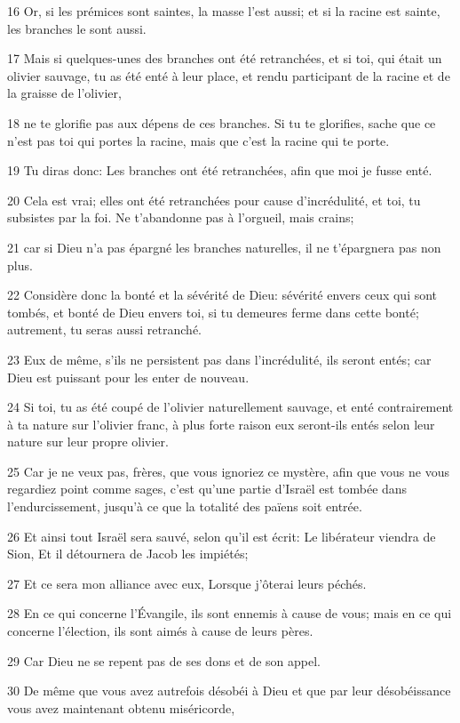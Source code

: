 \par 16 Or, si les prémices sont saintes, la masse l'est aussi; et si la racine est sainte, les branches le sont aussi.
\par 17 Mais si quelques-unes des branches ont été retranchées, et si toi, qui était un olivier sauvage, tu as été enté à leur place, et rendu participant de la racine et de la graisse de l'olivier,
\par 18 ne te glorifie pas aux dépens de ces branches. Si tu te glorifies, sache que ce n'est pas toi qui portes la racine, mais que c'est la racine qui te porte.
\par 19 Tu diras donc: Les branches ont été retranchées, afin que moi je fusse enté.
\par 20 Cela est vrai; elles ont été retranchées pour cause d'incrédulité, et toi, tu subsistes par la foi. Ne t'abandonne pas à l'orgueil, mais crains;
\par 21 car si Dieu n'a pas épargné les branches naturelles, il ne t'épargnera pas non plus.
\par 22 Considère donc la bonté et la sévérité de Dieu: sévérité envers ceux qui sont tombés, et bonté de Dieu envers toi, si tu demeures ferme dans cette bonté; autrement, tu seras aussi retranché.
\par 23 Eux de même, s'ils ne persistent pas dans l'incrédulité, ils seront entés; car Dieu est puissant pour les enter de nouveau.
\par 24 Si toi, tu as été coupé de l'olivier naturellement sauvage, et enté contrairement à ta nature sur l'olivier franc, à plus forte raison eux seront-ils entés selon leur nature sur leur propre olivier.
\par 25 Car je ne veux pas, frères, que vous ignoriez ce mystère, afin que vous ne vous regardiez point comme sages, c'est qu'une partie d'Israël est tombée dans l'endurcissement, jusqu'à ce que la totalité des païens soit entrée.
\par 26 Et ainsi tout Israël sera sauvé, selon qu'il est écrit: Le libérateur viendra de Sion, Et il détournera de Jacob les impiétés;
\par 27 Et ce sera mon alliance avec eux, Lorsque j'ôterai leurs péchés.
\par 28 En ce qui concerne l'Évangile, ils sont ennemis à cause de vous; mais en ce qui concerne l'élection, ils sont aimés à cause de leurs pères.
\par 29 Car Dieu ne se repent pas de ses dons et de son appel.
\par 30 De même que vous avez autrefois désobéi à Dieu et que par leur désobéissance vous avez maintenant obtenu miséricorde,
